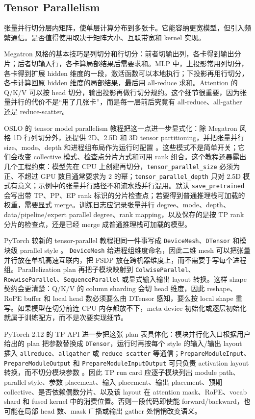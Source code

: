 \documentclass[UTF8,zihao=-4,openany]{ctexbook}
\begin{document}
\subsection{Tensor Parallelism}
张量并行切分层内矩阵，使单层计算分布到多张卡。它能容纳更宽模型，但引入频繁通信。是否值得使用取决于矩阵大小、互联带宽和 kernel 实现。

Megatron 风格的基本技巧是列切分和行切分：前者切输出列，各卡得到输出分片；后者切输入行，各卡算局部结果后需要求和。MLP 中，上投影常用列切分，各卡得到扩展 hidden 维度的一段，激活函数可以本地执行；下投影再用行切分，各卡计算回原 hidden 维度的局部结果，最后用 all-reduce 求和。Attention 的 Q/K/V 可以按 head 切分，输出投影再做行切分规约。这个细节很重要，因为张量并行的代价不是“用了几张卡”，而是每一层前后究竟有 all-reduce、all-gather 还是 reduce-scatter。

OSLO 的 tensor model parallelism 教程把这一点进一步显式化：除 Megatron 风格 1D 行列切分外，还提供 2D、2.5D 和 3D tensor partitioning，并把张量并行 size、mode、depth 和进程组布局作为运行时配置 \cite{oslo2025tensorparallel}。这些模式不是简单开关；它们会改变 collective 模式、检查点分片方式和可用 rank 组合。这个教程还暴露出几个工程约束：模型先在 CPU 上创建再切分，\texttt{tensor\_parallel\_size} 必须为正、不超过 GPU 数且通常要求为 2 的幂；\texttt{tensor\_parallel\_depth} 只对 2.5D 模式有意义；示例中的张量并行路径不和流水线并行混用。默认 \texttt{save\_pretrained} 会写出带 TP、PP、EP rank 标识的分片检查点；若要得到普通推理栈可加载的权重，需要显式 merge。训练日志应记录张量并行 degree、mode、depth、data/pipeline/expert parallel degree、rank mapping，以及保存的是按 TP rank 分片的检查点，还是已经 merge 成普通推理栈可加载的模型。

PyTorch 较新的 tensor-parallel 教程把同一件事写成 \texttt{DeviceMesh}、\texttt{DTensor} 和模块级 parallel style \cite{pytorch2025tptutorial,pytorch2025devicemesh}。 \texttt{DeviceMesh} 给进程组维度命名，因此二维 mesh 可以把张量并行放在单机高速互联内，把 FSDP 放在跨机器维度上，而不需要手写每个进程组。Parallelization plan 再把子模块映射到 \texttt{ColwiseParallel}、\texttt{RowwiseParallel}、\texttt{SequenceParallel} 或显式输入输出 layout 转换。这样 shape 契约会更清楚：Q/K/V 的 column sharding 会切 head 维度，因此 reshape、RoPE buffer 和 local head 数必须要么由 DTensor 感知，要么按 local shape 重写。如果模型在切分前连 CPU 内存都放不下，meta-device 初始化或逐层初始化就属于训练配方，而不是次要实现细节。

PyTorch 2.12 的 TP API 进一步把这张 plan 表具体化：模块并行化入口根据用户给出的 plan 把参数替换成 \texttt{DTensor}，运行时再按每个 style 的输入/输出 layout 插入 \texttt{allreduce}、\texttt{allgather} 或 \texttt{reduce\_scatter} 等通信；\texttt{PrepareModuleInput}、\texttt{PrepareModuleOutput} 和 \texttt{PrepareModuleInputOutput} 可只负责 activation layout 转换，而不切分模块参数 \cite{pytorch2026tensorparallelapi}。因此 TP run card 应逐子模块列出 module path、parallel style、参数 placement、输入 placement、输出 placement、预期 collective、是否依赖偶数分片、以及该 layout 在 attention mask、RoPE、vocab shard 和 fused kernel 中的消费位置。否则一段代码即使能 forward/backward，也可能在局部 head 数、mask 广播或输出 gather 处悄悄改变语义。
\end{document}
